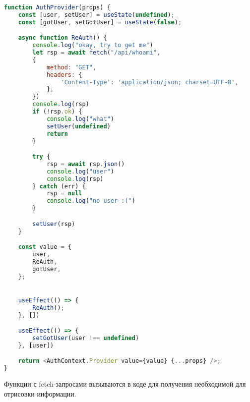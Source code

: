 \documentclass[a4paper,12pt]{article}
\begin{document}
\begin{lstlisting}[language=JavaScript, caption={Компонент AuthProvider, необходимый для аутентификации пользователя.}]
function AuthProvider(props) {
    const [user, setUser] = useState(undefined);
    const [gotUser, setGotUser] = useState(false);

    async function ReAuth() {
        console.log("okay, try to get me")
        let rsp = await fetch("/api/whoami",
        {
            method: "GET",
            headers: {
                'Content-Type': 'application/json; charset=UTF-8',
            },
        })
        console.log(rsp)
        if (!rsp.ok) {
            console.log("what")
            setUser(undefined)
            return
        }

        try {
            rsp = await rsp.json()
            console.log("user")
            console.log(rsp)
        } catch (err) {
            rsp = null
            console.log("no user :(")
        }

        setUser(rsp)
    }

    const value = {
        user,
        ReAuth,
        gotUser,
    };


    useEffect(() => {
        ReAuth();
    }, [])

    useEffect(() => {
        setGotUser(user !== undefined)
    }, [user])

    return <AuthContext.Provider value={value} {...props} />;
}
\end{lstlisting}

Функции с fetch-запросами вызываются в коде для получения необходимой для отрисовки информации.
\end{document}
